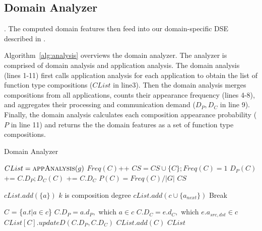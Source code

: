 \subsection{Domain Analyzer}
\label{sec:analyzer} 

 . The computed domain features then feed into our domain-specific DSE described in .

Algorithm~\ref{alg:analysis} overviews the domain analyzer. The analyzer is comprised of domain analysis and application analysis. The domain analysis (lines 1-11) first calls application analysis for each application to obtain the list of function type compositions ($CList$ in line3). Then the domain analysis merges compositions from all applications, counts their appearance frequency (lines 4-8), and aggregates their processing and communication demand ($D_P, D_C$ in line 9). Finally, the domain analysis calculates each composition appearance probability ($P$ in line 11) and returns the the domain features as a set of function type compositions.

\begin{algorithm}
\caption{Domain Analyzer}
\label{alg:analysis}
\begin{algorithmic}[1]
{\footnotesize
{}
		\State $CList = \Call{appAnalysis}{g}$
					\State $Freq(C)$++
				\Else
					\State $CS = CS \cup \{C\}; Freq(C) = 1$
				\EndIf
				\State $D_{P}(C)$ += $C.D_{P}; D_{C}(C)$ += $C.D_{C}$
		\EndFor
	\EndFor
		\State $P(C) = Freq(C) / \left\vert{G}\right\vert$
	\EndFor
	\Return $CS$
\EndFunction
\item[]
		\State $cList.add( \{a\} )$
	\EndFor
	\Comment $k$ is composition degree
					\State $cList.add( c \cup \{a_{next}\} )$
				\EndIf
			\EndFor
		\EndFor
		 Break
	\EndFor

			\State $C$ = \{$a.t \vert a \in c$\}
			 $C.D_{P} = a.d_{P},$ which $a \in c$
			 $C.D_{C} = e.d_{C},$ which $ e.a_{src,dst} \in c$
				\State $CList[C].updateD(C.D_{P},C.D_{C})$
			\Else
				\State $CList.add(C)$
			\EndIf
	\EndFor
	\Return $CList$
\EndFunction
}
\end{algorithmic}
\end{algorithm}

